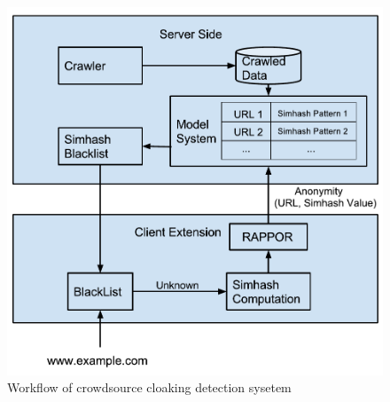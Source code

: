 \begin{figure}[t]
  \centering
  \includegraphics[width=.5\textwidth]{fig/crowdsourcing-cloaking-detection-system}
  \caption{Workflow of crowdsource cloaking detection sysetem}
  \label{fig:workflow}
\end{figure}

%
